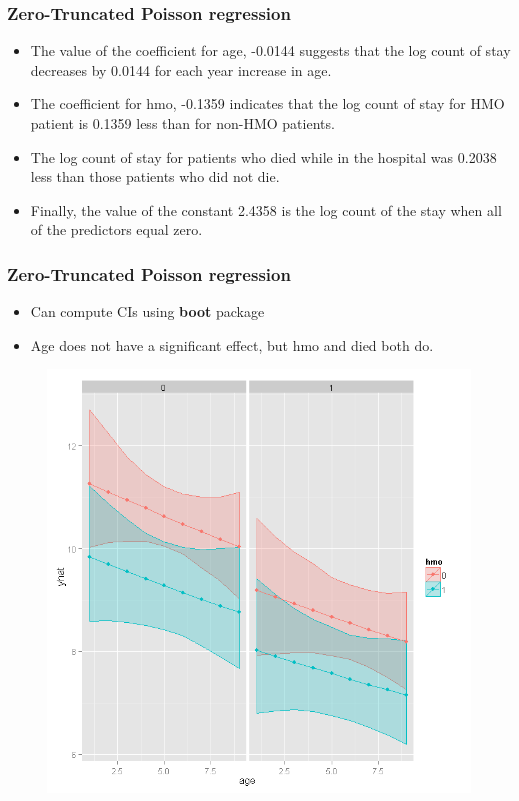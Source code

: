 \documentclass[MASTER.tex]{subfiles}
\begin{document}
\begin{frame}
	\frametitle{Zero-Truncated Poisson regression}
	\large

\begin{itemize}
\item The value of the coefficient for age, -0.0144 suggests that the log count of stay decreases by 0.0144 for each year increase in age.
\item The coefficient for hmo, -0.1359 indicates that the log count of stay for HMO patient is 0.1359 less than for non-HMO patients.
\item The log count of stay for patients who died while in the hospital was 0.2038 less than those patients who did not die.
\item Finally, the value of the constant 2.4358 is the log count of the stay when all of the predictors equal zero.
\end{itemize}
\end{frame}

\begin{frame}
	\frametitle{Zero-Truncated Poisson regression}
	\large
	
	\begin{itemize}
\item Can compute CIs using \textbf{boot} package
\item Age does not have a significant effect, but hmo and died both do.
\end{itemize}
\end{frame}

\begin{frame}
	\begin{figure}
		\centering
		\includegraphics[width=0.8\linewidth]{hospitalstay2}
		
	\end{figure}
\end{frame}
\end{document}

